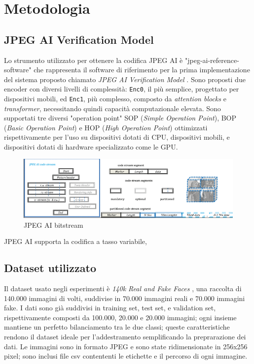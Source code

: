 \chapter{Metodologia}\label{ch:work}
\section{JPEG AI Verification Model}\label{sec:vm}
Lo strumento utilizzato per ottenere la codifica JPEG AI è "jpeg-ai-reference-software" \cite{jpeg-ai-ref-sw} che rappresenta il software di riferimento per la prima implementazione del sistema proposto chiamato \textit{JPEG AI Verification Model} \cite{wg1n100279}. Sono proposti due encoder con diversi livelli di complessità: \texttt{Enc0}, il più semplice, progettato per dispositivi mobili, ed \texttt{Enc1}, più complesso, composto da \textit{attention blocks} e\textit{ transformer}, necessitando quindi capacità computazionale elevata.
Sono supportati tre diversi "operation point" SOP (\textit{Simple Operation Point}), BOP (\textit{Basic Operation Point}) e HOP (\textit{High Operation Point}) ottimizzati rispettivamente per l'uso su dispositivi dotati di CPU, dispositivi mobili, e dispositivi dotati di hardware specializzato come le GPU.
\begin{figure}
    \centering
    \includegraphics[width=1\linewidth]{img/JPEG AI codestream.png}
    \caption{JPEG AI bitstream}
    \label{fig:bitstream}
\end{figure}
JPEG AI supporta la codifica a tasso variabile, 
\section{Dataset utilizzato}\label{sec:dataset}
Il dataset usato negli esperimenti è \textit{140k Real and Fake Faces} \cite{140kRealFake}, una raccolta di 140.000 immagini di volti, suddivise in 70.000  immagini reali e 70.000 immagini fake.
I dati sono già suddivisi in training set, test set, e validation set, rispettivamente composti da 100.000, 20.000 e 20.000 immagini; ogni insieme mantiene un perfetto bilanciamento tra le due classi; queste caratteristiche rendono il dataset ideale per l'addestramento semplificando la preprarazione dei dati. Le immagini sono in formato JPEG e sono state ridimensionate in 256x256 pixel; sono inclusi file csv contententi le etichette e il percorso di ogni immagine.
